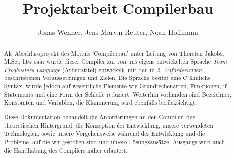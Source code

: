 \documentclass[12pt, a4paper, oneside, ngerman]{article}
\title{Projektarbeit Compilerbau}
\begin{document}
\author{Jonas Wenner, Jens Marvin Reuter, Noah Hoffmann}

\maketitle
\thispagestyle{empty}
\pagebreak
\tableofcontents
\newpage


\begin{abstract}


Als Abschlussprojekt des Moduls 'Compilerbau' unter Leitung von Thorsten Jakobs, M.Sc., htw saar wurde dieser Compiler zur von uns eigens entwickelten Sprache \textit{Team Progbusters Language} (Arbeitstitel) entwickelt, mit den in \textit{2. Anforderungen} beschriebenen Voraussetzungen und Zielen. Die Sprache besitzt eine C-ähnliche Syntax, wurde jedoch auf wesentliche Elemente wie Grundrechenarten, Funktionen, if-Statements und eine Form der Schleife reduziert. Weiterhin vorhanden sind Bezeichner, Konstanten und Variablen, die Klammerung wird ebenfalls berücksichtigt.

Diese Dokumentation behandelt die Anforderungen an den Compiler, den theoretischen Hintergrund, die Konzeption der Entwicklung, unsere verwendeten Technologien, sowie unsere Vorgehensweise während der Entwicklung und die Probleme, auf die wir gestoßen sind und unsere Lösungsansätze. Ausgangs wird auch die Handhabung des Compilers näher erläutert.

\end{abstract}

\newpage

\pagebreak

\pagebreak

\pagebreak

\pagebreak

\pagebreak

\pagebreak

\pagebreak

\pagebreak
\end{document}
